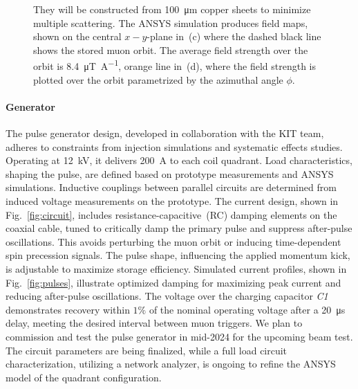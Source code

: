\begin{refsection}
\begin{figure}
{            They will be constructed from \SI{100}{\micro m} copper sheets to minimize multiple scattering.
            The ANSYS simulation produces field maps, shown on the central $x-y$-plane in~(c) where the dashed black line shows the stored muon orbit. 
            The average field strength over the orbit is \SI{8.4}{\micro\tesla\per\ampere}, orange line in~(d), where the field strength is plotted over the orbit parametrized by the azimuthal angle $\phi$.}
        \label{fig:coils}
        \end{figure}
        
        \paragraph{Generator}
        The pulse generator design, developed in collaboration with the KIT team, adheres to constraints from injection simulations and systematic effects studies. 
        Operating at \SI{12}{kV}, it delivers \SI{200}{A} to each coil quadrant. 
        Load characteristics, shaping the pulse, are defined based on prototype measurements and ANSYS simulations. 
        Inductive couplings between parallel circuits are determined from induced voltage measurements on the prototype.
        The current design, shown in Fig.~\ref{fig:circuit}, includes resistance-capacitive~(RC) damping elements on the coaxial cable, tuned to critically damp the primary pulse and suppress after-pulse oscillations. 
        This avoids perturbing the muon orbit or inducing time-dependent spin precession signals. 
        The pulse shape, influencing the applied momentum kick, is adjustable to maximize storage efficiency. 
        Simulated current profiles, shown in Fig.~\ref{fig:pulses}, illustrate optimized damping for maximizing peak current and reducing after-pulse oscillations. 
        The voltage over the charging capacitor \textit{C1} demonstrates recovery within $1\%$ of the nominal operating voltage after a \SI{20}{\micro s} delay, meeting the desired interval between muon triggers.
        We plan to commission and test the pulse generator in mid-2024 for the upcoming beam test. 
        The circuit parameters are being finalized, while a full load circuit characterization, utilizing a network analyzer, is ongoing to refine the ANSYS model of the quadrant configuration.
            

\end{refsection}
